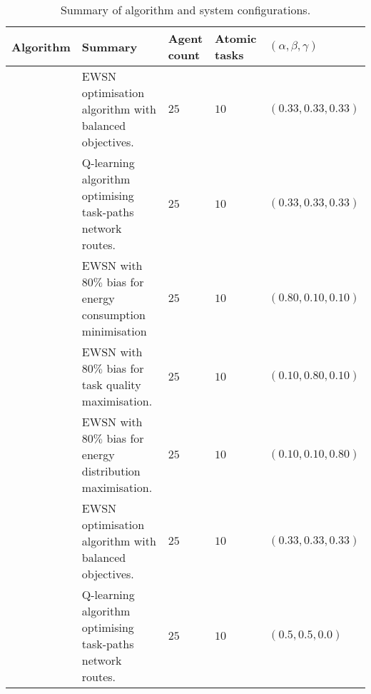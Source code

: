 
\begin{table}[h]
	\begin{tabular}
		{|p{}|p{}|p{}|p{}|p{}|}
		\hline
		\textbf{Algorithm} & \textbf{Summary} & \textbf{Agent count} & \textbf{Atomic tasks}  & \textbf{$(\alpha,\beta,\gamma)$}\\
		\hline
		\algorithmBalancedSimple{}{} &  EWSN optimisation algorithm with balanced objectives. & $25$ & $10$    & $(0.33,0.33,0.33)$  \\
		\algorithmDynaQSimple{}{} &  Q-learning algorithm optimising task-paths network routes. & $25$ & $10$    & $(0.33,0.33,0.33)$  \\
		\algorithmEnergy{}{} & EWSN with $80\%$ bias for energy consumption minimisation  & $25$ & $10$   & $(0.80,0.10,0.10)$  \\
		\algorithmQuality{}{} & EWSN with $80\%$ bias for task quality maximisation. & $25$ & $10$   & $(0.10,0.80,0.10)$  \\
		\algorithmDistribution{}{} & EWSN with $80\%$ bias for energy distribution maximisation. & $25$ & $10$  & $(0.10,0.10,0.80)$  \\
		\algorithmFailure{}{} &  EWSN optimisation algorithm with balanced objectives. & $25$ & $10$   & $(0.33,0.33,0.33)$  \\
		\algorithmDynaQFailure{}{} &  Q-learning algorithm optimising task-paths network routes.  & $25$ & $10$ & $(0.5,0.5,0.0)$  \\
		
		\hline
	\end{tabular}
	\captionsetup{labelfont=bf,singlelinecheck=on}
	\caption{Summary of algorithm and system configurations.}
	\label{table:summary_of_configurations}
\end{table}

